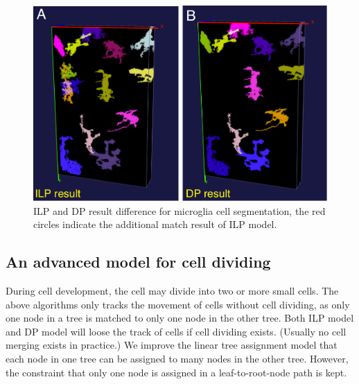 \begin{figure}[htbp]
\centering
\includegraphics[width=1.0\textwidth]{images/treeassign_threepoint2}
\caption[ILP and DP result difference for microglia cell segmentation]{ILP and DP result difference for microglia cell segmentation, the red circles indicate the additional match result of ILP model.}
\label{fig:treeassign-threepoint2}
\end{figure}

\subsection{An advanced model for cell dividing}
During cell development, the cell may divide into two or more small cells. The above algorithms only tracks the movement of cells without cell dividing, as only one node in a tree is matched to only one node in the other tree. Both ILP model and DP model will loose the track of cells if cell dividing exists. (Usually no cell merging exists in practice.) We improve the linear tree assignment model that each node in one tree can be assigned to many nodes in the other tree. However, the constraint that only one node is assigned in a leaf-to-root-node path is kept. 

